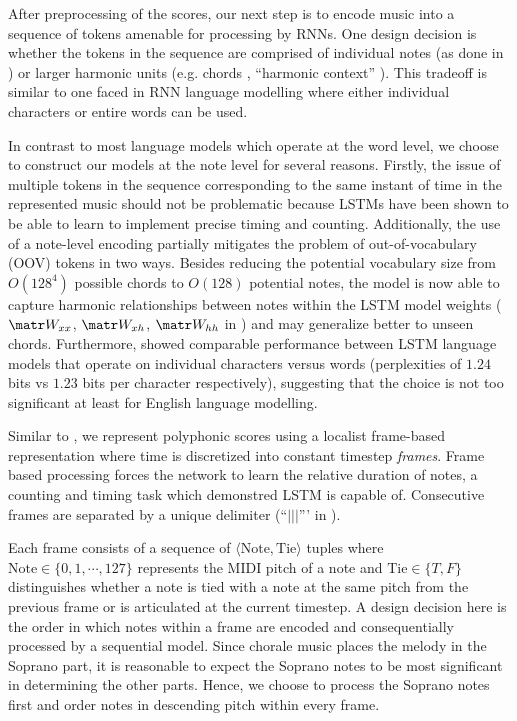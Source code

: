 After preprocessing of the scores, our next step is to encode music into a
sequence of tokens amenable for processing by RNNs. One design decision is
whether the tokens in the sequence are comprised of individual notes (as done
in \citep{mozer1994neural,franklin2004recurrent,surm2016music}) or larger
harmonic units (e.g. chords \citep{Eck2002,Boulanger-Lewandowski2012},
``harmonic context'' \citep{Allan2005}). This tradeoff is similar to one faced
in RNN language modelling where either individual characters or entire words
can be used.

In contrast to most language models which operate at the word level, we choose
to construct our models at the note level for several reasons.
Firstly, the issue of multiple tokens in the sequence corresponding to the same
instant of time in the represented music should not be problematic because
LSTMs have been shown to be able to learn to implement precise timing and
counting\cite{gers2002learning}. Additionally, the use of a note-level encoding
partially mitigates the problem of out-of-vocabulary (OOV) tokens in two ways.
Besides reducing the potential vocabulary size from $O(128^4)$ possible chords
to $O(128)$ potential notes, the model is now able to capture harmonic
relationships between notes within the LSTM model weights ($\W_{xx}$,
$\W_{xh}$, $\W_{hh}$ in ) and may generalize better to unseen
chords. Furthermore, \citet{graves2013generating} showed comparable performance
between LSTM language models that operate on individual characters versus words
(perplexities of $1.24$ bits vs $1.23$ bits per character respectively),
suggesting that the choice is not too significant at least for English language
modelling.


Similar to \citep{todd1989connectionist}, we represent polyphonic scores using
a localist frame-based representation where time is discretized into constant
timestep \emph{frames}. Frame based processing forces the network to learn the
relative duration of notes, a counting and timing task which
\citep{gers2002learning} demonstred LSTM is capable of. Consecutive frames are
separated by a unique delimiter (``$|||$''' in ).

Each frame consists of a sequence of $\langle \text{Note}, \text{Tie} \rangle$
tuples where $\text{Note} \in \{0,1,\cdots,127\}$ represents the MIDI pitch of
a note and $\text{Tie} \in \{T,F\}$ distinguishes whether a note is tied with a
note at the same pitch from the previous frame or is articulated at the current
timestep. A design decision here is the order in which notes within a frame are
encoded and consequentially processed by a sequential model. Since chorale
music places the melody in the Soprano part, it is reasonable to expect the
Soprano notes to be most significant in determining the other parts. Hence, we
choose to process the Soprano notes first and order notes in descending pitch
within every frame.

